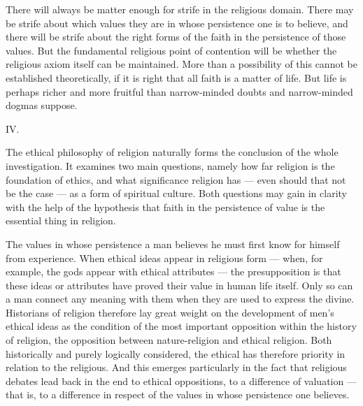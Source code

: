 \documentclass[12pt,a4paper]{article}
\newcommand{\snum}[1]{\bigskip\begin{center}#1\end{center}\nopagebreak\medskip}
\newcommand{\opage}[1]{\marginnote{\footnotesize\textit{[#1]}}}
\begin{document}
There will always be matter enough for strife in the religious domain. There
may be strife about which values they are in whose persistence one is to
believe, and there will be strife about the right forms of the faith in the
persistence of those values. But the fundamental religious point of contention
will be whether the religious axiom itself can be maintained. More than a
possibility of this cannot be established theoretically, if it is right that
all faith is a matter of life. But life is perhaps richer and more fruitful
than narrow-minded doubts and narrow-minded dogmas suppose.

\snum{IV.}

The ethical philosophy of religion naturally forms the conclusion of the whole
investigation. It examines two main questions, namely how far religion is the
foundation of ethics, and what significance religion has --- even should that
not be the case --- as a form of spiritual culture. Both questions may gain in
clarity with the help of the hypothesis that faith in the persistence of value
is the essential thing in religion.

The values in whose persistence a man believes he must first know for himself
from experience. When ethical ideas appear in religious form --- when, for
example, the gods appear with ethical attributes --- the presupposition is that
these ideas or attributes have proved their value in human life itself. Only so
can a man connect any meaning with them when they are used to express the
divine. Historians of religion therefore lay great weight on the development of
men's ethical
\opage{420}ideas as the condition of the most important opposition within the history of
religion, the opposition between nature-religion and ethical religion. Both
historically and purely logically considered, the ethical has therefore
priority in relation to the religious. And this emerges particularly in the
fact that religious debates lead back in the end to ethical oppositions, to a
difference of valuation --- that is, to a difference in respect of the values
in whose persistence one believes.
\end{document}
